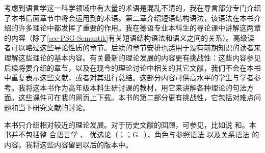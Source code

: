 考虑到语言学这一科学领域中有大量的术语是混乱不清的，我在导言部分专门介绍了本书后面章节中将会运用到的术语。第二章介绍短语结构语法，该语法在本书介绍的许多理论中都发挥了重要的作用。我在德语专业本科生的导论课中讲解这两章的内容（除了\ref{sec-PSG-Semantik}有关短语结构语法和语义之间的关系）。高级读者可以略过这些导论性质的章节。后续的章节安排也适用于没有前期知识的读者来理解这些理论的基本内容。有关最新的理论发展的内容更有挑战性：这些内容参见后续将要介绍的章节，以及在现今的理论讨论中相关的其它文献，我们不会在本书中重复表示这些文献，或者对其进行总结。这部分内容可供高水平的学生与学者参考。我将这本书作为高年级本科生研讨课的教材，用它来讲解各种理论的句法方面。这些课件可在我的网页上下载。本书的第二部分更有挑战性，它包括对难点问题和当下研究文献的讨论。

本书只介绍相对较近的理论发展。对于历史文献的回顾，可参见，比如说 \citet{Robins97a-u}和\citet{JL2006a-u}。本书并不包括整
合语言学 \citep{Lieb83a-u,Eisenberg2004a,Nolda2007a-u}、
优选论\indexotc（\citealp{PS93a-u}；\citealp{Grimshaw97a-u}；G.\ \citealp{GMueller2000a-u}）、角色与参照语法 \citep{vanValin93a-ed}以及关系语法
 \citep{Perlmutter83a-ed,Perlmutter84b-ed}的内容。我将这些内容留到以后的版本中。

